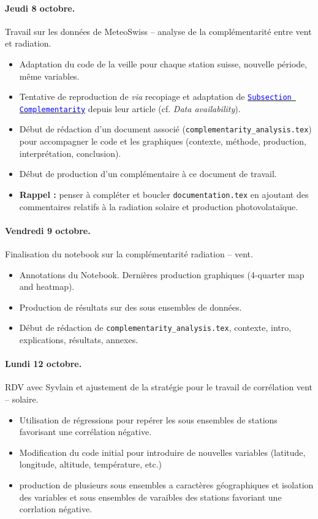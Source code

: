 \documentclass[11pt, a4paper]{article}
\begin{document}
\paragraph{Jeudi 8 octobre.} Travail sur les données de MeteoSwiss -- analyse de la complémentarité entre vent et radiation.
\begin{itemize}
    \item Adaptation du code de la veille pour chaque station suisse, nouvelle période, même variables.
    \item Tentative de reproduction de \cite[Fig. 1]{cauz2025embracing} \textit{via} recopiage et adaptation de \href{https://github.com/alefunxo/Complementarity-Wind-PV/}{\textcolor{blue}{\texttt{Subsection Complementarity}}} depuis leur article (cf. \textit{Data availability}). 
    \item Début de rédaction d'un document associé (\texttt{complementarity\_analysis.tex}) pour accompagner le code et les graphiques (contexte, méthode, production, interprétation, conclusion).
    \item Début de production d'un complémentaire à ce document de travail.
    \item \textbf{Rappel :} penser à compléter et boucler \texttt{documentation.tex} en ajoutant des commentaires relatifs à la radiation solaire et production photovolataïque. 
\end{itemize}

\paragraph{Vendredi 9 octobre.} Finalisation du notebook sur la complémentarité radiation -- vent. 
\begin{itemize}
    \item Annotations du Notebook. Dernières production graphiques (4-quarter map and heatmap). 
    \item Production de résultats sur des sous ensembles de données.
    \item Début de rédaction de \texttt{complementarity\_analysis.tex}, contexte, intro, explications, résultats, annexes. 
\end{itemize}

\paragraph{Lundi 12 octobre.} RDV avec Syvlain et ajustement de la stratégie pour le travail de corrélation vent -- solaire.
\begin{itemize}
    \item Utilisation de régressions pour repérer les sous ensembles de stations favorisant une corrélation négative.
    \item Modification du code initial pour introduire de nouvelles variables (latitude, longitude, altitude, température, etc.)
    \item production de plusieurs sous ensembles a caractères géographiques et isolation des variables et sous ensembles de varaibles des stations favoriant une corrlation négative. 
\end{itemize}
\end{document}
